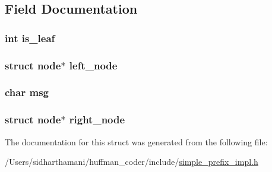 \subsection{Field Documentation}
\hypertarget{structnode_ad066657fe1374fb9852c285175a3774f}{
\subsubsection[{is\-\_\-leaf}]{\setlength{\rightskip}{0pt plus 5cm}int is\-\_\-leaf}}\label{structnode_ad066657fe1374fb9852c285175a3774f}
\hypertarget{structnode_a43dd3cf499d5b2270fcfbb29eb0a0d66}{
\subsubsection[{left\-\_\-node}]{\setlength{\rightskip}{0pt plus 5cm}struct {\bf node}$\ast$ left\-\_\-node}}\label{structnode_a43dd3cf499d5b2270fcfbb29eb0a0d66}
\hypertarget{structnode_ad80e777cd260fdd5ca6ad3f25b5e76de}{
\subsubsection[{msg}]{\setlength{\rightskip}{0pt plus 5cm}char msg}}\label{structnode_ad80e777cd260fdd5ca6ad3f25b5e76de}
\hypertarget{structnode_af729d9e66cefdd8c0a114cb0da5f7b7c}{
\subsubsection[{right\-\_\-node}]{\setlength{\rightskip}{0pt plus 5cm}struct {\bf node}$\ast$ right\-\_\-node}}\label{structnode_af729d9e66cefdd8c0a114cb0da5f7b7c}


The documentation for this struct was generated from the following file\-:\begin{DoxyCompactItemize}
\item 
/\-Users/sidharthamani/huffman\-\_\-coder/include/\hyperlink{simple__prefix__impl_8h}{simple\-\_\-prefix\-\_\-impl.\-h}\end{DoxyCompactItemize}

